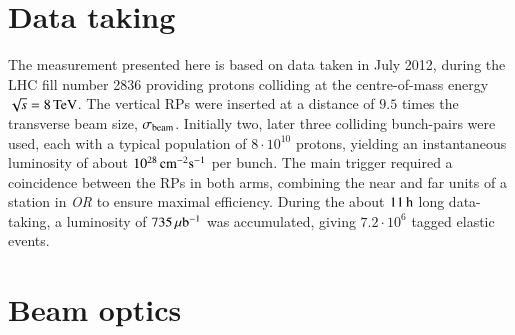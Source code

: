 \section{Data taking}
\label{sec:data taking}

The measurement presented here is based on data taken in July 2012, during the LHC fill number 2836 providing protons colliding at the centre-of-mass energy $\sqrt s = 8\,{\rm TeV}$. The vertical RPs were inserted at a distance of $9.5$ times the transverse beam size, $\sigma_{\rm beam}$. Initially two, later three colliding bunch-pairs were used, each with a typical population of $8\cdot10^{10}$ protons, yielding an instantaneous luminosity of about $10^{28}\,{\rm cm^{-2}s^{-1}}$ per bunch. The main trigger required a coincidence between the RPs in both arms, combining the near and far units of a station in \textit{OR} to ensure maximal efficiency. During the about $11\,{\rm h}$ long data-taking, a luminosity of $735\,{\rm \mu b^{-1}}$ was accumulated, giving $7.2\cdot 10^6$ tagged elastic events.



\section{Beam optics}
\label{sec:beam optics}

